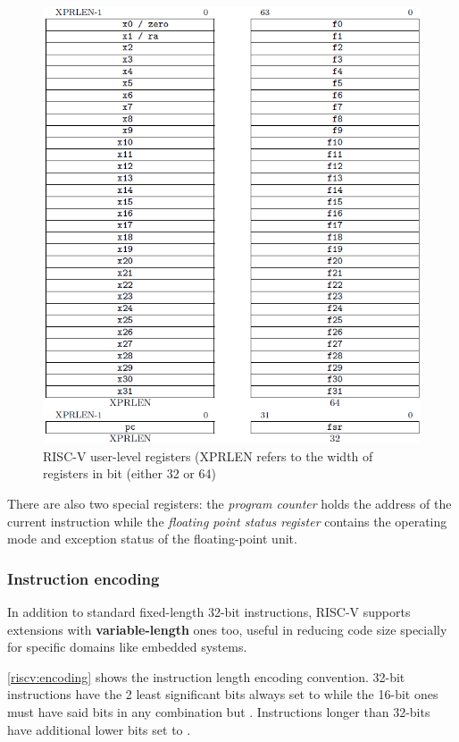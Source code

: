 \documentclass[12pt,oneside,a4paper]{article}
\begin{document}
\begin{figure}[h]
	\centering
	\includegraphics[scale=0.8]{risc-v_registers}
	\caption{RISC-V user-level registers (XPRLEN refers to the width of registers in bit (either 32 or 64)}
	\label{riscv:registers}
\end{figure}

There are also two special registers: the \textit{program counter} {\selectfont{pc}} holds the address of the current instruction while the \textit{floating point status register} {\selectfont{fsr}} contains the operating mode and exception status of the floating-point unit.
\subsubsection{Instruction encoding}
In addition to standard fixed-length 32-bit instructions, RISC-V supports extensions with \textbf{variable-length} ones too, useful in reducing code size specially for specific domains like embedded systems.

\cref{riscv:encoding} shows the instruction length encoding convention. 32-bit instructions have the 2 least significant bits always set to {\selectfont{1}} while the 16-bit ones must have said bits in any combination but {\selectfont{11}}.
Instructions longer than 32-bits have additional lower bits set to {\selectfont{1}}.\medskip
\end{document}
